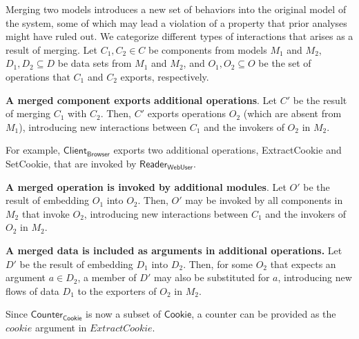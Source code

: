 Merging two models introduces a new set of behaviors into
the original model of the system, some of which may lead a violation
of a property that prior analyses might have ruled out. We categorize
different types of interactions that arises as a result of
merging. Let $C_1, C_2 \in C$ be components from models $M_1$ and
$M_2$, $D_1, D_2 \subseteq D$ be data sets from $M_1$ and $M_2$, and
$O_1, O_2 \subseteq O$ be the set of operations that $C_1$ and $C_2$
exports, respectively. 

\textbf{A merged component exports additional operations}. Let $C'$ be
the result of merging $C_1$ with $C_2$. Then, $C'$ exports operations
$O_2$ (which are absent from $M_1$), introducing new interactions
between $C_1$ and the invokers of $O_2$ in $M_2$. 

For example, $\textsf{Client}_\textsf{Browser}$ exports two additional
operations, \textsf{ExtractCookie} and \textsf{SetCookie}, that are
invoked by $\textsf{Reader}_\textsf{WebUser}$.

\textbf{A merged operation is invoked by additional modules}. Let $O'$
be the result of embedding $O_1$ into $O_2$. Then, $O'$ may be invoked
by all components in $M_2$ that invoke $O_2$, introducing new interactions
between $C_1$ and the invokers of $O_2$ in $M_2$.

\textbf{A merged data is included as arguments in additional
  operations.}  Let $D'$ be the result of embedding $D_1$ into
$D_2$. Then, for some $O_2$ that expects an argument $a \in D_2$,
a member of $D'$ may also be substituted for $a$, introducing new
flows of data $D_1$ to the exporters of $O_2$ in $M_2$.

Since $\textsf{Counter}_\textsf{Cookie}$ is now a
subset of $\textsf{Cookie}$, a counter can be provided as the $cookie$
argument in $ExtractCookie$.



